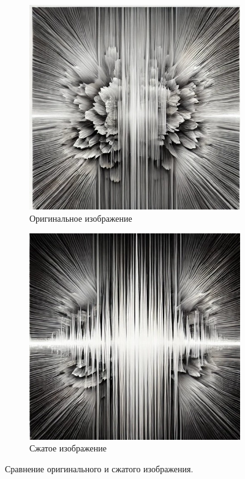 {\begin{figure}[h!]
  \centering
  \begin{subfigure}[b]{0.45\textwidth}
      \centering
      \includegraphics[width=\textwidth]{FourierBefore.jpeg} %
      \caption{Оригинальное изображение}
      \label{fig:original}
  \end{subfigure}
  \hfill
  \begin{subfigure}[b]{0.45\textwidth}
      \centering
      \includegraphics[width=\textwidth]{FourierAfter.jpeg} %
      \caption{Сжатое изображение}
      \label{fig:compressed}
  \end{subfigure}
  \caption{Сравнение оригинального и сжатого изображения.}
  \label{fig:comparison}
\end{figure}

}

